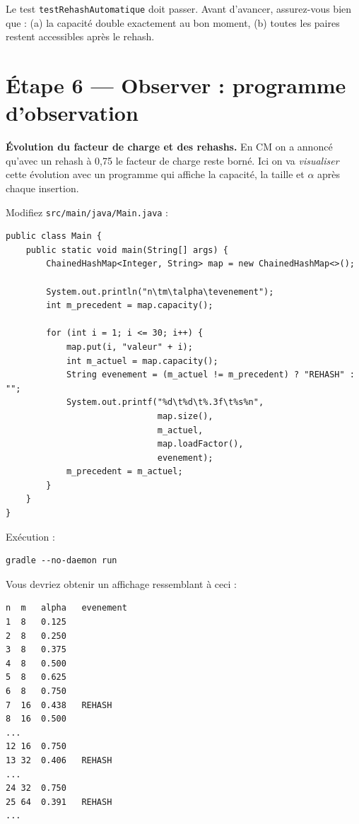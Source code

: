 \documentclass[11pt,a4paper]{article}
\begin{document}
\begin{exercicebox}
Le test \texttt{testRehashAutomatique} doit passer. Avant d'avancer, assurez-vous bien que : (a) la capacité double exactement au bon moment, (b) toutes les paires restent accessibles après le rehash.
\end{exercicebox}

\section{Étape 6 --- Observer : programme d'observation}

\begin{lienbox}[Ce qu'on matérialise du CM]
\textbf{Évolution du facteur de charge et des rehashs.} En CM on a annoncé qu'avec un rehash à 0,75 le facteur de charge reste borné. Ici on va \emph{visualiser} cette évolution avec un programme qui affiche la capacité, la taille et $\alpha$ après chaque insertion.
\end{lienbox}

Modifiez \texttt{src/main/java/Main.java} :

\begin{lstlisting}[style=java]
public class Main {
    public static void main(String[] args) {
        ChainedHashMap<Integer, String> map = new ChainedHashMap<>();

        System.out.println("n\tm\talpha\tevenement");
        int m_precedent = map.capacity();

        for (int i = 1; i <= 30; i++) {
            map.put(i, "valeur" + i);
            int m_actuel = map.capacity();
            String evenement = (m_actuel != m_precedent) ? "REHASH" : "";
            System.out.printf("%d\t%d\t%.3f\t%s%n",
                              map.size(),
                              m_actuel,
                              map.loadFactor(),
                              evenement);
            m_precedent = m_actuel;
        }
    }
}
\end{lstlisting}

Exécution :
\begin{lstlisting}[style=bash]
gradle --no-daemon run
\end{lstlisting}

Vous devriez obtenir un affichage ressemblant à ceci :

\begin{lstlisting}[style=output]
n  m   alpha   evenement
1  8   0.125
2  8   0.250
3  8   0.375
4  8   0.500
5  8   0.625
6  8   0.750
7  16  0.438   REHASH
8  16  0.500
...
12 16  0.750
13 32  0.406   REHASH
...
24 32  0.750
25 64  0.391   REHASH
...
\end{lstlisting}
\end{document}
